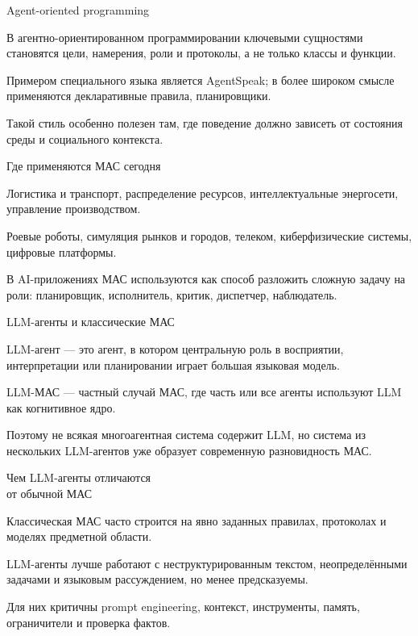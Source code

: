 \begin{frame}{Agent-oriented programming}
	\topline
	\justifying
	\begin{textitemize}
		\item В агентно-ориентированном программировании ключевыми сущностями становятся цели, намерения, роли и протоколы, а не только классы и функции.
		\item Примером специального языка является AgentSpeak; в более широком смысле применяются декларативные правила, планировщики.
		\item Такой стиль особенно полезен там, где поведение должно зависеть от состояния среды и социального контекста.
	\end{textitemize}
\end{frame}

\begin{frame}{Где применяются МАС сегодня}
	\topline
	\justifying
	\begin{textitemize}
		\item Логистика и транспорт, распределение ресурсов, интеллектуальные энергосети, управление производством.
		\item Роевые роботы, симуляция рынков и городов, телеком, киберфизические системы, цифровые платформы.
		\item В AI-приложениях МАС используются как способ разложить сложную задачу на роли: планировщик, исполнитель, критик, диспетчер, наблюдатель.
	\end{textitemize}
\end{frame}

\begin{frame}{LLM-агенты и классические МАС}
	\topline
	\justifying
	\begin{textitemize}
		\item LLM-агент --- это агент, в котором центральную роль в восприятии, интерпретации или планировании играет большая языковая модель.
		\item LLM-МАС --- частный случай МАС, где часть или все агенты используют LLM как когнитивное ядро.
		\item Поэтому не всякая многоагентная система содержит LLM, но система из нескольких LLM-агентов уже образует современную разновидность МАС.
	\end{textitemize}
\end{frame}

\begin{frame}{Чем LLM-агенты отличаются\\ от обычной МАС}
	\topline
	\justifying
	\begin{textitemize}
		\item Классическая МАС часто строится на явно заданных правилах, протоколах и моделях предметной области.
		\item LLM-агенты лучше работают с неструктурированным текстом, неопределёнными задачами и языковым рассуждением, но менее предсказуемы.
		\item Для них критичны prompt engineering, контекст, инструменты, память, ограничители и проверка фактов.
	\end{textitemize}
\end{frame}

